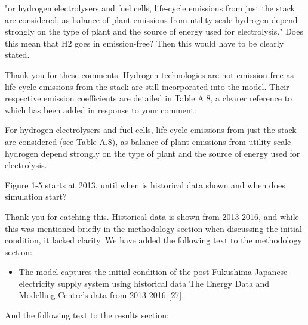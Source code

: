 \documentclass[answers,11pt]{exam}
\begin{document}
\begin{questions}
\begin{solution}
                
        \end{solution}
        

        
         \question "or hydrogen electrolysers and fuel cells, life-cycle emissions from just the stack are considered, as balance-of-plant emissions from utility scale hydrogen depend strongly on the type of plant and the source of energy used for electrolysis."
Does this mean that H2 goes in emission-free? Then this would have to be clearly stated.
        \begin{solution}
                Thank you for these comments. Hydrogen technologies are not emission-free as life-cycle emissions from the stack are still incorporated into the model. Their respective emission coefficients are detailed in Table A.8, a clearer reference to which has been added in response to your comment:
                
                For hydrogen electrolysers and fuel cells, life-cycle emissions from just the stack are considered (see Table A.8), as balance-of-plant emissions from utility scale hydrogen depend strongly on the type of plant and the source of energy used for electrolysis. 
                
        \end{solution}      
        
          
         \question Figure 1-5 starts at 2013, until when is historical data shown and when does simulation start?
        \begin{solution}
                Thank you for catching this. Historical data is shown from 2013-2016, and while this was mentioned briefly in the methodology section when discussing the initial condition, it lacked clarity. We have added the following text to the methodology section:
                \begin{itemize}
                
                \item The model captures the initial condition of the post-Fukushima Japanese electricity supply system using historical data The Energy Data and Modelling Centre’s data from 2013-2016 [27].
                \end{itemize}
                
                And the following text to the results section:
                \begin{itemize}
                

\end{itemize}
\end{solution}
\end{questions}
\end{document}
